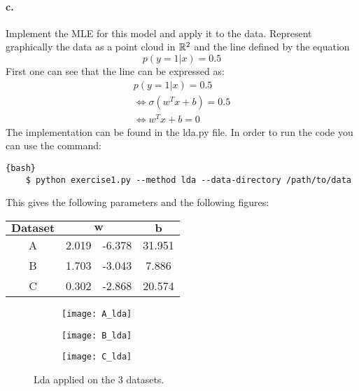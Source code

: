 \documentclass{article}
\begin{document}
\paragraph{c.} Implement the MLE for this model and apply it to the data. Represent graphically the data as a point cloud in $\mathbb{R}^2$ and the
line defined by the equation
\begin{equation*}
    p(y=1|x)=0.5
\end{equation*}
First one can see that the line can be expressed as:
\begin{equation*}
    \begin{aligned}
        p(y=1|x)=0.5                           \\
        \Leftrightarrow \sigma(w^Tx + b) = 0.5 \\
        \Leftrightarrow w^Tx + b = 0
    \end{aligned}
\end{equation*}
The implementation can be found in the lda.py file. In order to run the code you can use the command:
\begin{lstlisting}{bash}
    $ python exercise1.py --method lda --data-directory /path/to/data
\end{lstlisting}
This gives the following parameters and the following figures:
\begin{tabular}{| c || c | c | c |}
    \hline
    $\mathbf{Dataset}$ & \multicolumn{2}{|c|}{$\mathbf{w}$} & $\mathbf{b}$          \\
    \hline
    A                  & 2.019                              & -6.378       & 31.951 \\
    \hline
    B                  & 1.703                              & -3.043       & 7.886  \\
    \hline
    C                  & 0.302                              & -2.868       & 20.574 \\
    \hline
\end{tabular}

\begin{figure}[h!]
    \centering
    \begin{subfigure}[b]{0.3\linewidth}
        \texttt{[image: A\_lda]}
    \end{subfigure}
    \begin{subfigure}[b]{0.3\linewidth}
        \texttt{[image: B\_lda]}
    \end{subfigure}
    \begin{subfigure}[b]{0.3\linewidth}
        \texttt{[image: C\_lda]}
    \end{subfigure}
    \caption{Lda applied on the 3 datasets.}
    \label{fig:lda}
\end{figure}
\end{document}
